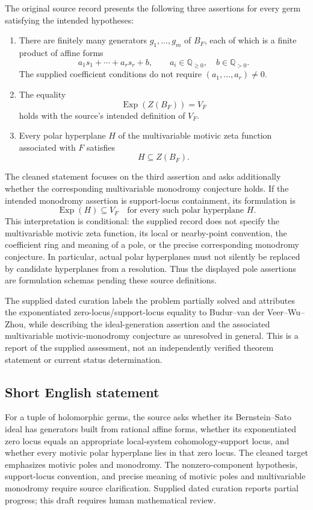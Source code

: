 \documentclass[11pt]{article}
\newcommand{\Q}{\mathbb{Q}}
\begin{document}
The original source record presents the following three assertions for every germ satisfying the intended hypotheses:
\begin{enumerate}
\item There are finitely many generators \(g_1,\ldots,g_m\) of \(B_F\), each of which is a finite product of affine forms
\[
 a_1s_1+\cdots+a_rs_r+b,
 \qquad a_i\in\Q_{\ge0},\quad b\in\Q_{>0}.
\]
The supplied coefficient conditions do not require \((a_1,\ldots,a_r)\ne0\).
\item The equality
\[
 \operatorname{Exp}(Z(B_F))=V_F
\]
holds with the source's intended definition of \(V_F\).
\item Every polar hyperplane \(H\) of the multivariable motivic zeta function associated with \(F\) satisfies
\[
 H\subseteq Z(B_F).
\]
\end{enumerate}
The cleaned statement focuses on the third assertion and asks additionally whether the corresponding multivariable monodromy conjecture holds. If the intended monodromy assertion is support-locus containment, its formulation is
\[
 \operatorname{Exp}(H)\subseteq V_F
 \quad\text{for every such polar hyperplane }H.
\]
This interpretation is conditional: the supplied record does not specify the multivariable motivic zeta function, its local or nearby-point convention, the coefficient ring and meaning of a pole, or the precise corresponding monodromy conjecture. In particular, actual polar hyperplanes must not silently be replaced by candidate hyperplanes from a resolution. Thus the displayed pole assertions are formulation schemas pending these source definitions.

The supplied dated curation labels the problem partially solved and attributes the exponentiated zero-locus/support-locus equality to Budur--van der Veer--Wu--Zhou, while describing the ideal-generation assertion and the associated multivariable motivic-monodromy conjecture as unresolved in general. This is a report of the supplied assessment, not an independently verified theorem statement or current status determination.
\subsection{Short English statement}
For a tuple of holomorphic germs, the source asks whether its Bernstein--Sato ideal has generators built from rational affine forms, whether its exponentiated zero locus equals an appropriate local-system cohomology-support locus, and whether every motivic polar hyperplane lies in that zero locus. The cleaned target emphasizes motivic poles and monodromy. The nonzero-component hypothesis, support-locus convention, and precise meaning of motivic poles and multivariable monodromy require source clarification. Supplied dated curation reports partial progress; this draft requires human mathematical review.
\end{document}
